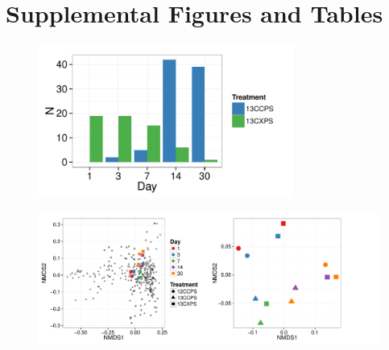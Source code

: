 \thispagestyle{empty}


\section{Supplemental Figures and Tables}

\begin{figure}[H]
	\begin{center}
	\centerline{\includegraphics[width=0.75\textwidth]{figures/all_rspndr_bar/all_rspndr_bar.pdf}}
	\caption{\protect}\label{fig:rspndr_count}
        \end{center}
\end{figure}

\begin{figure}[H]
	\begin{center}
		\centerline{\includegraphics[width=\textwidth]{figures/bulk_ordination/bulk_ordination.pdf}}
	\caption{\protect}\label{fig:bulk_ord}
        \end{center}
\end{figure}

